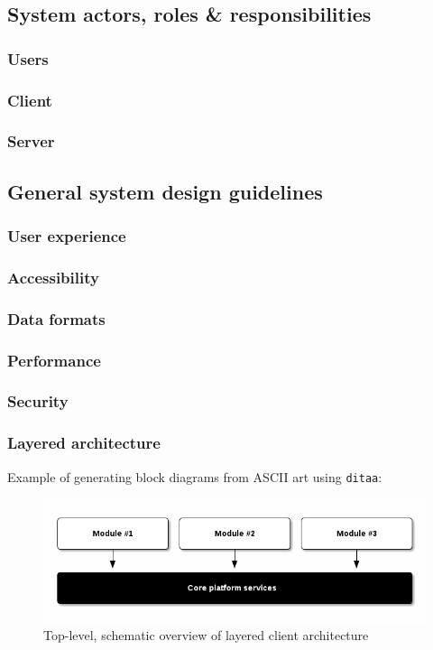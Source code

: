 \documentclass[letterpaper, 9pt, onecolumn, twoside, technote, final]{IEEEtran}
\begin{document}
\subsection{System actors, roles \& responsibilities}
\label{sec:orgc7eef90}
\subsubsection{Users}
\label{sec:org69f1a35}
\subsubsection{Client}
\label{sec:org2095bfa}
\subsubsection{Server}
\label{sec:orge531b4b}
\subsection{General system design guidelines}
\label{sec:org9b48fbc}
\subsubsection{User experience}
\label{sec:orgb4b0575}
\subsubsection{Accessibility}
\label{sec:org4b7d82e}
\subsubsection{Data formats}
\label{sec:org3cc81e4}
\subsubsection{Performance}
\label{sec:orgb48e3e1}
\subsubsection{Security}
\label{sec:orgfa8aec1}
\subsubsection{Layered architecture}
\label{sec:org7fffbec}

Example of generating block diagrams from ASCII art using \texttt{ditaa}:

\begin{figure}[htbp]
\centering
\includegraphics[width=.9\linewidth]{assets/arch.png}
\caption{Top-level, schematic overview of layered client architecture}
\end{figure}
\end{document}
